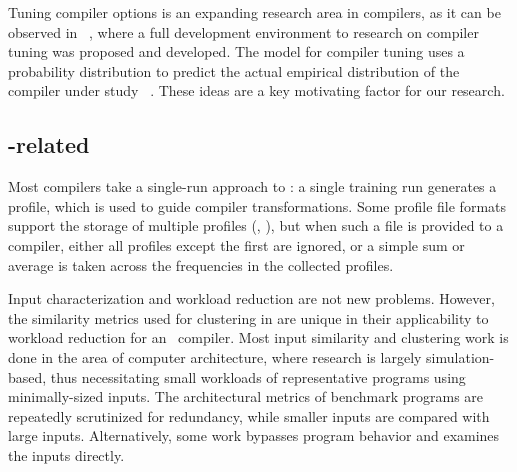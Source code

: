 
Tuning compiler options is an expanding research area in compilers, as
it can be observed in ~\cite{Milepost08}, where a full development
environment to research on compiler tuning was proposed and developed.
The model for compiler tuning uses a probability distribution to predict
the actual empirical distribution of the compiler under study
~\cite{BonillaICML2006}. These ideas are a key motivating factor for
our research.

\subsection{\FDO-related}

Most compilers take a single-run approach to \FDO: a single training run
generates a profile, which is used to guide compiler transformations.
Some profile file formats support the storage of multiple profiles
(\eg, \llvm), but when such a file is provided to a compiler, either
all profiles except the first are ignored, or a simple sum or average
is taken across the frequencies in the collected profiles.

Input characterization and workload reduction are not new problems.
However, the similarity metrics used for clustering
in \cite{BerubePhD} are unique in their applicability to
workload reduction for an \FDO\ compiler.  Most input similarity and
clustering work is done in the area of computer architecture, where
research is largely simulation-based, thus necessitating small
workloads of representative programs using minimally-sized inputs. The
architectural metrics of benchmark programs are repeatedly scrutinized
for redundancy, while smaller inputs are compared with large
inputs. Alternatively, some work bypasses program behavior and
examines the inputs directly.


